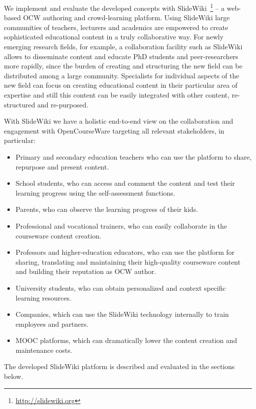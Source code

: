 \documentclass[ngerman,UKenglish,table]{scrbook}
\begin{document}
We implement and evaluate the developed concepts with SlideWiki~\footnote{\url{http://slidewiki.org}} -- a web-based OCW authoring and crowd-learning platform.
Using SlideWiki large communities of teachers, lecturers and academics are empowered to create sophisticated educational content in a truly collaborative way.
For newly emerging research fields, for example, a collaboration facility such as SlideWiki allows to disseminate content and educate PhD students and peer-researchers more rapidly, since the burden of creating and structuring the new field can be distributed among a large community.
Specialists for individual aspects of the new field can focus on creating educational content in their particular area of expertise and still this content can be easily integrated with other content, re-structured and re-purposed.

With SlideWiki we have a holistic end-to-end view on the collaboration and engagement with OpenCourseWare targeting all relevant stakeholders, in particular:
\begin{itemize}
\item Primary and secondary education teachers who can use the platform to share, repurpose and present content.
\item School students, who can access and comment the content and test their learning progress using the self-assessment functions.
\item Parents, who can observe the learning progress of their kids.
\item Professional and vocational trainers, who can easily collaborate in the courseware content creation.
\item Professors and higher-education educators, who can use the platform for sharing, translating and maintaining their high-quality courseware content and building their reputation as OCW author.
\item University students, who can obtain personalized and context specific learning resources.
\item Companies, which can use the SlideWiki technology internally to train employees and partners.
\item MOOC platforms, which can dramatically lower the content creation and maintenance costs.
\end{itemize}

The developed SlideWiki platform is described and evaluated in the sections below. 
\end{document}
